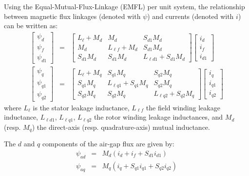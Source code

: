 Using the Equal-Mutual-Flux-Linkage (EMFL) per unit system, the relationship between magnetic flux linkages (denoted with $\psi$) and currents (denoted with $i$) can be written as:
\begin{eqnarray}
\left[ \begin{array}{c} \psi_d \\ \psi_f \\ \psi_{d1} \end{array} \right] & = &
\left[ \begin{array}{ccc} L_\ell + M_d & M_d & S_{d1} M_d \\
M_d & L_{\ell f} + M_d & S_{d1} M_d \\
S_{d1} M_d & S_{d1} M_d & L_{\ell d1} + S_{d1} M_d \end{array} \right]
\left[ \begin{array}{c} i_d \\ i_f \\ i_{d1} \end{array} \right] \label{sync-flux-d} \\
\left[ \begin{array}{c} \psi_q \\ \psi_{q1} \\ \psi_{q2} \end{array} \right] & = &
\left[ \begin{array}{ccc} L_\ell + M_q & S_{q1} M_q & S_{q2} M_q \\
S_{q1} M_q & L_{\ell q1} + S_{q1} M_q & S_{q2} M_q \\
S_{q2} M_q & S_{q2} M_q & L_{\ell q2} + S_{q2} M_q \end{array} \right]
\left[ \begin{array}{c} i_q \\ i_{q1} \\ i_{q2} \end{array} \right] \label{sync-flux-q}
\end{eqnarray}
where $L_\ell$ is the stator leakage inductance, $L_{\ell f}$ the field winding leakage inductance, $L_{\ell d1}$, $L_{\ell q1}$, $L_{\ell q2}$ the rotor winding leakage inductances, and $M_d$ (resp. $M_q$) the direct-axis (resp. quadrature-axis) mutual inductance.

The $d$ and $q$ components of the air-gap flux are given by:
\begin{eqnarray}
\psi_{ad} & = & M_d ( i_d + i_f + S_{d1} i_{d1} ) \label{psiad-def} \\
\psi_{aq} & = & M_q ( i_q + S_{q1} i_{q1} + S_{q2} i_{q2} ) \label{psiaq-def}
\end{eqnarray}

